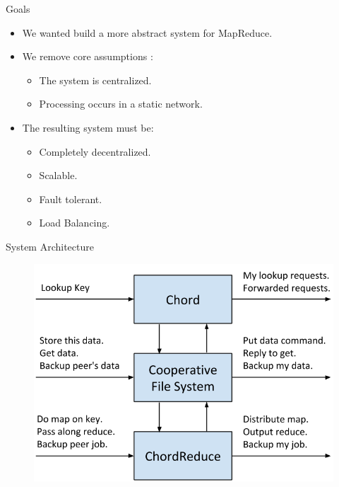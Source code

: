 \documentclass[11pt]{beamer}
\begin{document}
\begin{frame}{Goals}

	\begin{itemize}
		\item We wanted build a more abstract system for MapReduce.
		\item We remove core assumptions \cite{hadoopAssumptions}:
		\begin{itemize}
			\item The system is centralized.
			\item Processing occurs in a static network.
		\end{itemize}
		\item The resulting system must be:
		\begin{itemize}
			\item Completely decentralized.
			\item Scalable.
			\item Fault tolerant.
			\item Load Balancing.
		\end{itemize}
	\end{itemize}

\end{frame}


%
%
%

\begin{frame}{System Architecture}
	\begin{figure}
	    \includegraphics[width=0.8\linewidth]{figs/CR_architecture}
	
	\end{figure}
\end{frame}
\end{document}
